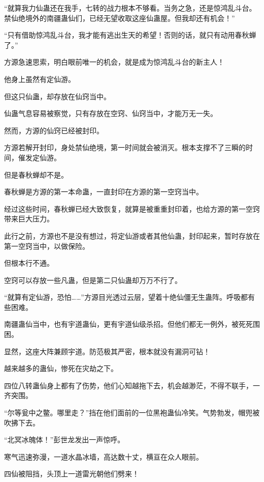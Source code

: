 
\begin{this_body}

“就算我力仙蛊还在我手，七转的战力根本不够看。当务之急，还是惊鸿乱斗台。禁仙绝境外的南疆蛊仙们，已经无望收取这座仙蛊屋。但我却还有机会！”

“只有借助惊鸿乱斗台，我才能有逃出生天的希望！否则的话，就只有动用春秋蝉了。”

方源急速思索，明白眼前唯一的机会，就是成为惊鸿乱斗台的新主人！

他身上虽然有定仙游。

但这只仙蛊，却存放在仙窍当中。

仙蛊气息容易被察觉，只有存放在空窍、仙窍当中，才能万无一失。

然而，方源的仙窍已经被封印。

方源若解开封印，身处禁仙绝境，第一时间就会被消灭。根本支撑不了三瞬的时间，催发定仙游。

但是春秋蝉却不是。

春秋蝉是方源的第一本命蛊，一直封印在方源的第一空窍当中。

经过这些时间，春秋蝉已经大致恢复，就算是被重重封印着，也给方源的第一空窍带来巨大压力。

此行之前，方源也不是没有想过，将定仙游或者其他仙蛊，封印起来，暂时存放在第一空窍当中，以做保险。

但根本行不通。

空窍可以存放一些凡蛊，但是第二只仙蛊却万万不行了。

“就算有定仙游，恐怕……”方源目光透过云层，望着十绝仙僵无生蛊阵。呼吸都有些困难。

南疆蛊仙当中，也有宇道蛊仙，更有宇道仙级杀招。但他们都无一例外，被死死围困。

显然，这座大阵兼顾宇道。防范极其严密，根本就没有漏洞可钻！

越来越多的蛊仙，惨死在灾劫之下。

四位八转蛊仙身上都有了伤势，他们心知越拖下去，机会越渺茫，不得不联手，一齐突围。

“尔等瓮中之鳖。哪里走？”挡在他们面前的一位黑袍蛊仙冷笑。气势勃发，帽兜被吹拂下去。

“北冥冰魄体！”彭世龙发出一声惊呼。

寒气迅速弥漫，一道水晶冰墙，高达数十丈，横亘在众人眼前。

四仙被阻挡，头顶上一道雷光朝他们劈来！


\end{this_body}
